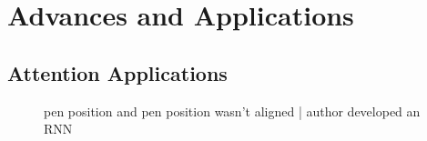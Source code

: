 \documentclass[11pt]{article}
\begin{document}
\begin{figure}[H]
    \centering
\end{figure}

\begin{figure}[H]
    \centering
\end{figure}

\begin{figure}[H]
    \centering
\end{figure}

\begin{figure}[H]
    \centering
\end{figure}

\begin{figure}[H]
    \centering
\end{figure}

\begin{figure}[H]
    \centering
\end{figure}

\begin{figure}[H]
    \centering
\end{figure}

\section{Advances and Applications}

\subsection{Attention Applications}

\begin{figure}[H]
    \centering
    \caption*{pen position and pen position wasn't aligned | author developed an RNN}
\end{figure}

\begin{figure}[H]
    \centering
\end{figure}
\end{document}
